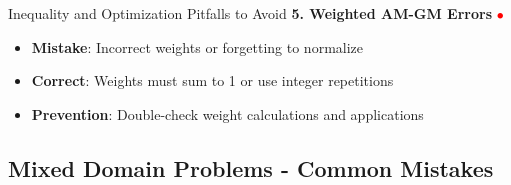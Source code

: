 \documentclass{article}
\begin{document}
\begin{trapbox}{Inequality and Optimization Pitfalls to Avoid}
\textbf{5. Weighted AM-GM Errors} \textcolor{red}{$\bullet$}
\begin{itemize}[nosep]
\item \textbf{Mistake}: Incorrect weights or forgetting to normalize
\item \textbf{Correct}: Weights must sum to 1 or use integer repetitions
\item \textbf{Prevention}: Double-check weight calculations and applications
\end{itemize}
\end{trapbox}

\subsection{Mixed Domain Problems - Common Mistakes}
\end{document}
